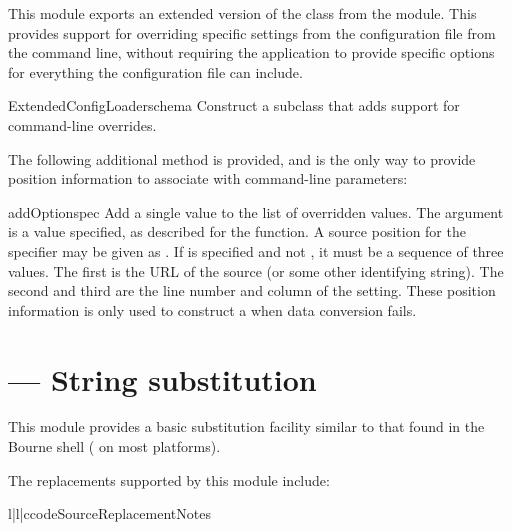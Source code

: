 \documentclass{howto}
\begin{document}
This module exports an extended version of the 
class from the  module.  This provides
support for overriding specific settings from the configuration file
from the command line, without requiring the application to provide
specific options for everything the configuration file can include.

\begin{classdesc}{ExtendedConfigLoader}{schema}
  Construct a  subclass that adds support for
  command-line overrides.
\end{classdesc}

The following additional method is provided, and is the only way to
provide position information to associate with command-line
parameters:

\begin{methoddesc}{addOption}{spec}
  Add a single value to the list of overridden values.  The 
  argument is a value specified, as described for the
   function.  A source
  position for the specifier may be given as .  If 
  is specified and not , it must be a sequence of three
  values.  The first is the URL of the source (or some other
  identifying string).  The second and third are the line number and
  column of the setting.  These position information is only used to
  construct a  when data conversion
  fails.
\end{methoddesc}


\section{ --- String substitution}


This module provides a basic substitution facility similar to that
found in the Bourne shell ( on most \UNIX{} platforms).  

The replacements supported by this module include:

\begin{tableiii}{l|l|c}{code}{Source}{Replacement}{Notes}
\end{tableiii}
\end{document}

